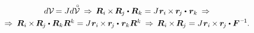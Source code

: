 

\nopagebreak\vspace{-0.25em}\begin{equation*}\begin{array}{c}
d\mathcal{V} \hspace{-0.2ex} = J d\mathcircabove{\mathcal{V}} \:\Rightarrow\,
\bm{R}_i \hspace{-0.1ex} \times \hspace{-0.2ex} \bm{R}_{\hspace{-0.1ex}j} \dotp \bm{R}_k = J \hspace{.12ex} \bm{r}_i \hspace{-0.16ex} \times \hspace{-0.1ex} \bm{r}_{\hspace{-0.2ex}j} \dotp \hspace{.16ex} \bm{r}_k \:\Rightarrow \\[.32em]
%
\Rightarrow\: \bm{R}_i \hspace{-0.1ex} \times \hspace{-0.2ex} \bm{R}_{\hspace{-0.1ex}j} \dotp \bm{R}_k \bm{R}^k = J \hspace{.12ex} \bm{r}_i \hspace{-0.16ex} \times \hspace{-0.1ex} \bm{r}_{\hspace{-0.2ex}j} \dotp \hspace{.16ex} \bm{r}_k \bm{R}^k
\:\Rightarrow\,
\bm{R}_i \hspace{-0.1ex} \times \hspace{-0.2ex} \bm{R}_{\hspace{-0.1ex}j} = J \hspace{.12ex} \bm{r}_i \hspace{-0.16ex} \times \hspace{-0.1ex} \bm{r}_{\hspace{-0.2ex}j} \dotp \bm{F}^{\hspace{.1ex}\expminusone} \hspace{-0.1ex}.
\end{array}\end{equation*}



